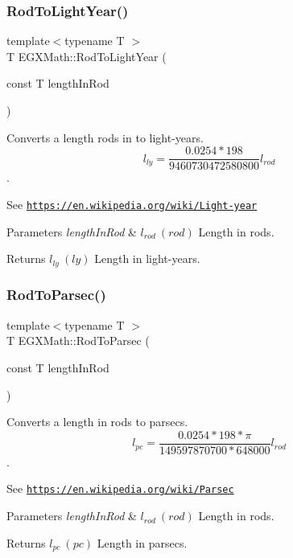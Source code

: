 \subsubsection{\texorpdfstring{Rod\+To\+Light\+Year()}{RodToLightYear()}}
{\footnotesize\ttfamily template$<$typename T $>$ \\
T E\+G\+X\+Math\+::\+Rod\+To\+Light\+Year (\begin{DoxyParamCaption}\item[{const T}]{length\+In\+Rod }\end{DoxyParamCaption})}



Converts a length rods in to light-\/years. \[ l_{ly}=\frac{0.0254 * 198}{9460730472580800} l_{rod} \]. 

See \href{https://en.wikipedia.org/wiki/Light-year}{\tt https\+://en.\+wikipedia.\+org/wiki/\+Light-\/year} 
\begin{DoxyParams}{Parameters}
{\em length\+In\+Rod} & $ l_{rod}\ (rod)$ Length in rods. \\
\hline
\end{DoxyParams}
\begin{DoxyReturn}{Returns}
$ l_{ly}\ (ly)$ Length in light-\/years. 
\end{DoxyReturn}
\mbox{\label{group___e_g_x_math-_conversions-_length_conversions-_imperial-_rod-_astronomical_ga720b170a8c3243d0f7d5be0c70381cb2}} 
\subsubsection{\texorpdfstring{Rod\+To\+Parsec()}{RodToParsec()}}
{\footnotesize\ttfamily template$<$typename T $>$ \\
T E\+G\+X\+Math\+::\+Rod\+To\+Parsec (\begin{DoxyParamCaption}\item[{const T}]{length\+In\+Rod }\end{DoxyParamCaption})}



Converts a length in rods to parsecs. \[ l_{pc}=\frac{0.0254 * 198 * \pi}{149597870700 * 648000} l_{rod} \]. 

See \href{https://en.wikipedia.org/wiki/Parsec}{\tt https\+://en.\+wikipedia.\+org/wiki/\+Parsec} 
\begin{DoxyParams}{Parameters}
{\em length\+In\+Rod} & $ l_{rod}\ (rod)$ Length in rods. \\
\hline
\end{DoxyParams}
\begin{DoxyReturn}{Returns}
$ l_{pc}\ (pc)$ Length in parsecs. 
\end{DoxyReturn}
